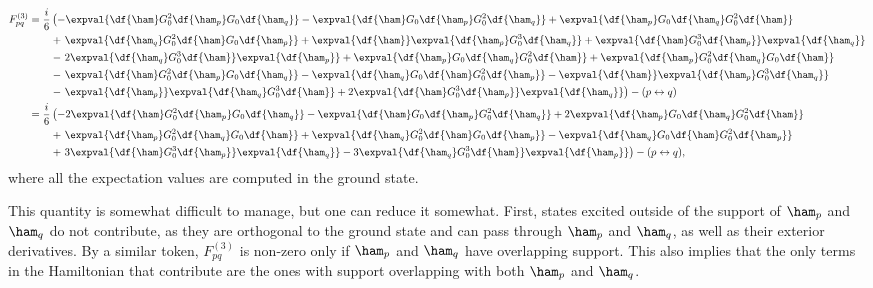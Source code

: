\begin{align*}
	F^{(3)}_{pq} = \frac{i}{6}&\left(-\expval{\df{\ham}G_{0}^{2}\df{\ham_{p}}G_{0}\df{\ham_{q}}} - \expval{\df{\ham}G_{0}\df{\ham_{p}}G_{0}^{2}\df{\ham_{q}}} + \expval{\df{\ham_{p}}G_{0}\df{\ham_{q}}G_{0}^{2}\df{\ham}} \right. \\
	&+ \left. \expval{\df{\ham_{q}}G_{0}^{2}\df{\ham}G_{0}\df{\ham_{p}}} + \expval{\df{\ham}}\expval{\df{\ham_{p}}G_{0}^{3}\df{\ham_{q}}} + \expval{\df{\ham}G_{0}^{3}\df{\ham_{p}}}\expval{\df{\ham_{q}}} \right. \\
	&- \left. 2\expval{\df{\ham_{q}}G_{0}^{3}\df{\ham}}\expval{\df{\ham_{p}}} + \expval{\df{\ham_{p}}G_{0}\df{\ham_{q}}G_{0}^{2}\df{\ham}} + \expval{\df{\ham_{p}}G_{0}^{2}\df{\ham_{q}}G_{0}\df{\ham}} \right. \\
	&- \left. \expval{\df{\ham}G_{0}^{2}\df{\ham_{p}}G_{0}\df{\ham_{q}}} - \expval{\df{\ham_{q}}G_{0}\df{\ham}G_{0}^{2}\df{\ham_{p}}} - \expval{\df{\ham}}\expval{\df{\ham_{p}}G_{0}^{3}\df{\ham_{q}}} \right. \\
	&- \left. \expval{\df{\ham_{p}}}\expval{\df{\ham_{q}}G_{0}^{3}\df{\ham}} + 2\expval{\df{\ham}G_{0}^{3}\df{\ham_{p}}}\expval{\df{\ham_{q}}}\right) - (p \leftrightarrow q) \\
	= \frac{i}{6}&\left(-2\expval{\df{\ham}G_{0}^{2}\df{\ham_{p}}G_{0}\df{\ham_{q}}} - \expval{\df{\ham}G_{0}\df{\ham_{p}}G_{0}^{2}\df{\ham_{q}}} + 2\expval{\df{\ham_{p}}G_{0}\df{\ham_{q}}G_{0}^{2}\df{\ham}} \right. \\
	&+ \left. \expval{\df{\ham_{p}}G_{0}^{2}\df{\ham_{q}}G_{0}\df{\ham}} + \expval{\df{\ham_{q}}G_{0}^{2}\df{\ham}G_{0}\df{\ham_{p}}} - \expval{\df{\ham_{q}}G_{0}\df{\ham}G_{0}^{2}\df{\ham_{p}}} \right. \\
	&+ \left. 3\expval{\df{\ham}G_{0}^{3}\df{\ham_{p}}}\expval{\df{\ham_{q}}} - 3\expval{\df{\ham_{q}}G_{0}^{3}\df{\ham}}\expval{\df{\ham_{p}}}\right) - (p \leftrightarrow q),
\end{align*}
where all the expectation values are computed in the ground state.

This quantity is somewhat difficult to manage, but one can reduce it somewhat. First, states excited outside of the support of $\ham_{p}$ and $\ham_{q}$ do not contribute, as they are orthogonal to the ground state and can pass through $\ham_{p}$ and $\ham_{q}$, as well as their exterior derivatives. By a similar token, $F^{(3)}_{pq}$ is non-zero only if $\ham_{p}$ and $\ham_{q}$ have overlapping support. This also implies that the only terms in the Hamiltonian that contribute are the ones with support overlapping with both $\ham_{p}$ and $\ham_{q}$.

